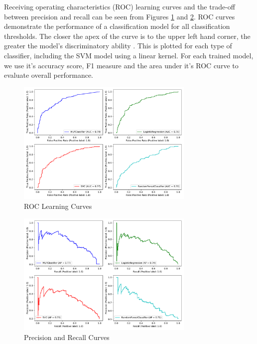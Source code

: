 Receiving operating characteristics (ROC) learning curves and the trade-off between precision and recall can be seen from Figures \ref{roc} and \ref{par}. ROC curves demonstrate the performance of a classification model for all classification thresholds. The closer the apex of the curve is to the upper left hand corner, the greater the model's discriminatory ability \cite{fan2006understanding}. This is plotted for each type of classifier, including the SVM model using a linear kernel. 
For each trained model, we use it's accuracy score, F1 measure and the area under it's ROC curve to evaluate overall performance.

\begin{figure}[ht]
\includegraphics[width=8.5cm]{plots/roccurves.pdf}
\caption{ROC Learning Curves}

\label{roc}
\centering
\end{figure}

\begin{figure}[ht]
\includegraphics[width=8.5cm]{plots/precisionrecall.pdf}
\caption{Precision and Recall Curves}

\label{par}
\centering
\end{figure}


